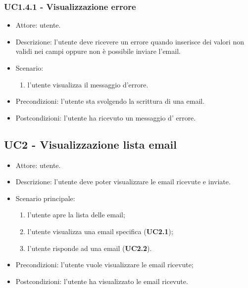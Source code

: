     \subsubsection{UC1.4.1 - Visualizzazione errore }
    \begin{itemize}
        \item Attore: utente.
        \item Descrizione: l'utente deve ricevere un errore quando inserisce dei valori non validi nei campi oppure non è possibile inviare l'email.
        \item Scenario:
        \begin{enumerate}
        \item l'utente visualizza il messaggio d'errore.
        \end{enumerate}  
        \item Precondizioni: l'utente sta svolgendo la scrittura di una email.
        \item Postcondizioni: l'utente ha ricevuto un messaggio d' errore.
    \end{itemize}

    \subsection{UC2 - Visualizzazione lista email}
    \begin{itemize}
        \item Attore: utente.
        \item Descrizione: l'utente deve poter visualizzare le email ricevute e inviate.
        \item Scenario principale:
            \begin{enumerate}
            \item l’utente apre la lista delle email;
            \item l'utente visualizza una email specifica (\textbf{UC2.1});
            \item l’utente risponde ad una email (\textbf{UC2.2}).
            \end{enumerate}
        \item Precondizioni: l'utente vuole visualizzare le email ricevute;
        \item Postcondizioni: l'utente ha visualizzato le email ricevute.
    \end{itemize}


